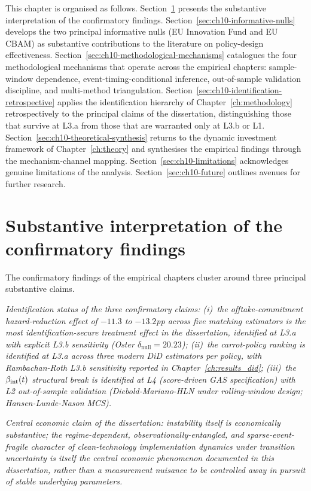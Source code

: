 This chapter is organised as follows. Section~\ref{sec:ch10-substantive} presents the substantive interpretation of the confirmatory findings. Section~\ref{sec:ch10-informative-nulls} develops the two principal informative nulls (EU Innovation Fund and EU CBAM) as substantive contributions to the literature on policy-design effectiveness. Section~\ref{sec:ch10-methodological-mechanisms} catalogues the four methodological mechanisms that operate across the empirical chapters: sample-window dependence, event-timing-conditional inference, out-of-sample validation discipline, and multi-method triangulation. Section~\ref{sec:ch10-identification-retrospective} applies the identification hierarchy of Chapter~\ref{ch:methodology} retrospectively to the principal claims of the dissertation, distinguishing those that survive at L3.a from those that are warranted only at L3.b or L1. Section~\ref{sec:ch10-theoretical-synthesis} returns to the dynamic investment framework of Chapter~\ref{ch:theory} and synthesises the empirical findings through the mechanism-channel mapping. Section~\ref{sec:ch10-limitations} acknowledges genuine limitations of the analysis. Section~\ref{sec:ch10-future} outlines avenues for further research.

\section{Substantive interpretation of the confirmatory findings}
\label{sec:ch10-substantive}

The confirmatory findings of the empirical chapters cluster around three principal substantive claims.

\noindent\emph{Identification status of the three confirmatory claims: (i)~the offtake-commitment hazard-reduction effect of $-11.3$ to $-13.2$pp across five matching estimators is the most identification-secure treatment effect in the dissertation, identified at L3.a with explicit L3.b sensitivity (Oster $\delta_{\text{null}} = 20.23$); (ii)~the carrot-policy ranking is identified at L3.a across three modern DiD estimators per policy, with Rambachan-Roth L3.b sensitivity reported in Chapter~\ref{ch:results_did}; (iii)~the $\beta_{\mathrm{int}}(t)$ structural break is identified at L4 (score-driven GAS specification) with L2 out-of-sample validation (Diebold-Mariano-HLN under rolling-window design; Hansen-Lunde-Nason MCS).}

\noindent\emph{Central economic claim of the dissertation: instability itself is economically substantive; the regime-dependent, observationally-entangled, and sparse-event-fragile character of clean-technology implementation dynamics under transition uncertainty is itself the central economic phenomenon documented in this dissertation, rather than a measurement nuisance to be controlled away in pursuit of stable underlying parameters.}

